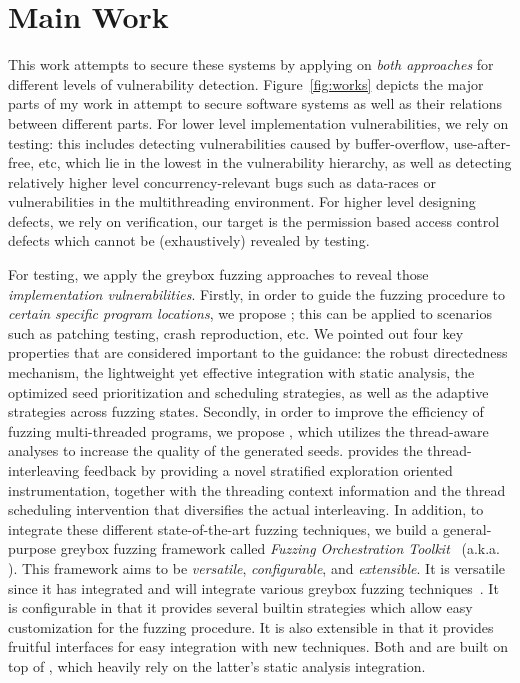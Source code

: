 \section{Main Work}

This work attempts to secure these systems by applying on \emph{both approaches} for different levels of vulnerability detection.  Figure~\ref{fig:works} depicts the major parts of my work in attempt to secure software systems as well as their relations between different parts. For lower level implementation vulnerabilities, we rely on testing: this includes detecting vulnerabilities caused by buffer-overflow, use-after-free, etc, which lie in the lowest in the vulnerability hierarchy, as well as detecting relatively higher level concurrency-relevant bugs such as data-races or vulnerabilities in the multithreading environment. For higher level designing defects, we rely on verification, our target is the permission based access control defects which cannot be (exhaustively) revealed by testing.

For testing, we apply the greybox fuzzing approaches to reveal those \emph{implementation vulnerabilities}.
Firstly, in order to guide the fuzzing procedure to \emph{certain specific program locations}, we propose \dFOT; this can be applied to scenarios such as patching testing, crash reproduction, etc. We pointed out four key properties that are considered important to the guidance: the robust directedness mechanism, the lightweight yet effective integration with static analysis, the optimized seed prioritization and scheduling strategies, as well as the adaptive strategies across fuzzing states. 
Secondly, in order to improve the efficiency of fuzzing multi-threaded programs, we propose \mtfuzz, which utilizes the thread-aware analyses to increase the quality of the generated seeds. \mtfuzz provides the thread-interleaving feedback by providing a novel stratified exploration oriented instrumentation, together with the threading context information and the thread scheduling intervention that diversifies the actual interleaving.
In addition, to integrate these different state-of-the-art fuzzing techniques, we build a general-purpose greybox fuzzing framework called \emph{Fuzzing Orchestration Toolkit}~\cite{fse18-fot} (a.k.a. \FOT). This framework aims to be \emph{versatile}, \emph{configurable}, and \emph{extensible}. It is versatile since it has integrated and will integrate various greybox fuzzing techniques~\cite{Bohme:2016:CGF,Bohme:2017:DGF,redqueen,CollAFL,Angora,fuzz_survey}. It is configurable in that it provides several builtin strategies which allow easy customization for the fuzzing procedure. It is also extensible in that it provides fruitful interfaces for easy integration with new techniques. Both \dFOT and \mtfuzz are built on top of \FOT, which heavily rely on the latter's static analysis integration.

